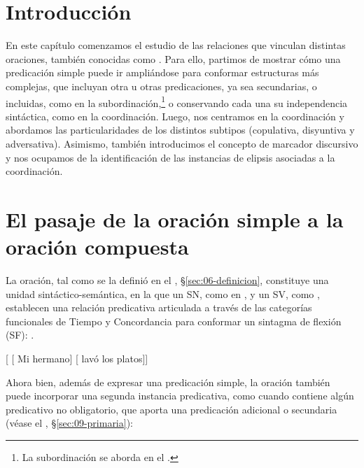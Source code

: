 
\section{Introducción}

En este capítulo comenzamos el estudio de las relaciones que vinculan distintas
oraciones, también conocidas como . Para
ello, partimos de mostrar cómo una predicación simple puede ir ampliándose para
conformar estructuras más complejas, que incluyan otra u otras predicaciones, ya
sea secundarias, o incluidas, como en la subordinación,\footnote{La subordinación
se aborda en el .} o conservando cada una su independencia
sintáctica, como en la coordinación. Luego, nos centramos en la coordinación y
abordamos las particularidades de los distintos subtipos (copulativa, disyuntiva
y adversativa). Asimismo, también introducimos el concepto de marcador discursivo
y nos ocupamos de la identificación de las instancias de elipsis asociadas a la
coordinación.

\section{El pasaje de la oración simple a la oración compuesta}\label{sec:12-pasaje}

La oración, tal como se la definió en el , §\ref{sec:06-definicion},
constituye una unidad sintáctico-semántica, en la que un SN, como  en , y un SV, como 
, establecen una relación predicativa articulada a través
de las categorías funcionales de Tiempo y Concordancia para conformar un
sintagma de flexión (SF): .

\begin{exe}
  \ex\label{ex:12-hermano1} {}[ [ Mi hermano]
      [ lavó los platos]]
\end{exe}

Ahora bien, además de expresar una predicación simple, la oración también puede
incorporar una segunda instancia predicativa, como cuando contiene algún
predicativo no obligatorio, que aporta una predicación adicional o secundaria
 (véase el , §\ref{sec:09-primaria}):

